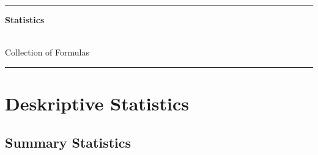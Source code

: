\documentclass[8pt]{extarticle}
\begin{document}
\hrule
\begin{center}
{\fontsize{30}{60}\selectfont \textbf{Statistics}} \\ \

{\fontsize{20}{60}\selectfont Collection of Formulas}
\end{center}
\hrule
\vfill
\tableofcontents

\clearpage


\raggedright %
\setlength{\parindent}{15pt} %
\setlength{\columnseprule}{0.3pt} %








\section{Deskriptive Statistics}


\subsection{Summary Statistics}
\end{document}
